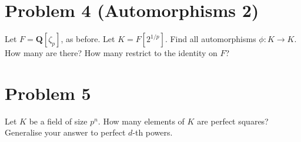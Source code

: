 \documentclass{amsart}
\begin{document}
\section{Problem 4 (Automorphisms 2)}
\label{sec:orgf3e5b55}

Let \(F = \mathbf{Q}[\zeta_p]\), as before.
Let \(K = F[2^{1/p}]\).
Find all automorphisms \(\phi \colon K \to K\).
How many are there?
How many restrict to the identity on \(F\)?
\section{Problem 5}
\label{sec:org0c14ce3}

Let \(K\) be a field of size \(p^n\).
How many elements of \(K\) are perfect squares?
Generalise your answer to perfect \(d\)-th powers.
\end{document}
